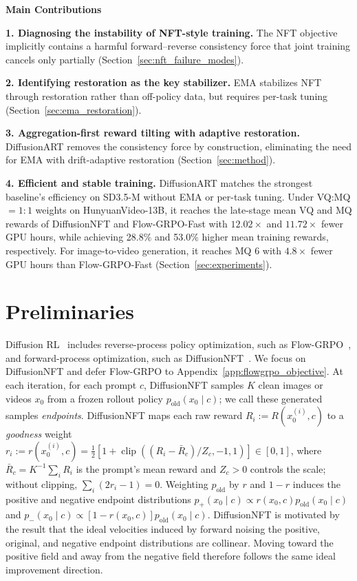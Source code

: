 \documentclass{article}
\begin{document}
{\textbf{Main Contributions}\\[3pt]}
{
\noindent\textbf{1. Diagnosing the instability of NFT-style training.} The NFT objective implicitly contains a harmful forward--reverse consistency force that joint training cancels only partially (Section~\ref{sec:nft_failure_modes}).\par\smallskip
\noindent\textbf{2. Identifying restoration as the key stabilizer.} EMA stabilizes NFT through restoration rather than off-policy data, but requires per-task tuning   (Section~\ref{sec:ema_restoration}).\par\smallskip
\noindent\textbf{3. Aggregation-first reward tilting with adaptive restoration.} DiffusionART removes the consistency force by construction, eliminating the need for EMA with drift-adaptive restoration (Section~\ref{sec:method}).  \par\smallskip
\noindent\textbf{4. Efficient and stable training.}
DiffusionART matches the strongest baseline's efficiency on SD3.5-M without EMA or per-task tuning.
Under VQ:MQ $=1{:}1$ weights on HunyuanVideo-13B, it reaches the late-stage mean VQ and MQ rewards of DiffusionNFT and Flow-GRPO-Fast with $12.02\times$ and $11.72\times$ fewer GPU hours, while achieving 28.8\% and 53.0\% higher mean training rewards, respectively.
For image-to-video generation, it reaches MQ 6 with $4.8\times$ fewer GPU hours than Flow-GRPO-Fast (Section~\ref{sec:experiments}).

}

\section{Preliminaries}
\label{sec:preliminaries}

Diffusion RL~\citep{xu2026pathspace} includes reverse-process policy optimization, such as Flow-GRPO~\citep{liu2025flowgrpo}, and forward-process optimization, such as DiffusionNFT~\citep{zheng2025diffusionnft,zhu2026crd,xue2026advantageweightedmatchingaligning}. We focus on DiffusionNFT and defer Flow-GRPO to Appendix~\ref{app:flowgrpo_objective}. At each iteration, for each prompt $c$, DiffusionNFT samples $K$ clean images or videos $x_0$ from a frozen rollout policy $p_{\mathrm{old}}(x_0\mid c)$; we call these generated samples \emph{endpoints}. DiffusionNFT maps each raw reward $R_i:=R(x_0^{(i)},c)$ to a \emph{goodness} weight $r_i:=r(x_0^{(i)},c)=\tfrac12[1+\operatorname{clip}((R_i-\bar R_c)/Z_c,-1,1)]\in[0,1]$, where $\bar R_c=K^{-1}\sum_iR_i$ is the prompt's mean reward and $Z_c>0$ controls the scale; without clipping, $\sum_i(2r_i-1)=0$. Weighting $p_{\mathrm{old}}$ by $r$ and $1-r$ induces the positive and negative endpoint distributions $p_+(x_0\mid c)\propto r(x_0,c)p_{\mathrm{old}}(x_0\mid c)$ and $p_-(x_0\mid c)\propto[1-r(x_0,c)]p_{\mathrm{old}}(x_0\mid c)$. DiffusionNFT is motivated by the result that the ideal velocities induced by forward noising the positive, original, and negative endpoint distributions are collinear. Moving toward the positive field and away from the negative field therefore follows the same ideal improvement direction.
\end{document}
